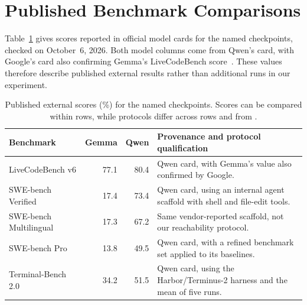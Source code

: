 \section{Published Benchmark Comparisons}
\label{app:external-comparison}

Table~\ref{tab:external-comparison} gives scores reported in official model cards for the named checkpoints, checked on October~6, 2026. Both model columns come from Qwen's card, with Google's card also confirming Gemma's LiveCodeBench score~\cite{qwen2026qwen36,google2026gemma4}. These values therefore describe published external results rather than additional runs in our experiment.

\begin{table}[t]
\centering
\caption{Published external scores (\%) for the named checkpoints. Scores can be compared within rows, while protocols differ across rows and from \benchmark.}
\label{tab:external-comparison}
\scriptsize
\begin{tabularx}{\textwidth}{lrrX}
\toprule
Benchmark & Gemma & Qwen & Provenance and protocol qualification \\
\midrule
LiveCodeBench v6 & 77.1 & 80.4 & Qwen card, with Gemma's value also confirmed by Google. \\
SWE-bench Verified & 17.4 & 73.4 & Qwen card, using an internal agent scaffold with shell and file-edit tools. \\
SWE-bench Multilingual & 17.3 & 67.2 & Same vendor-reported scaffold, not our reachability protocol. \\
SWE-bench Pro & 13.8 & 49.5 & Qwen card, with a refined benchmark set applied to its baselines. \\
Terminal-Bench 2.0 & 34.2 & 51.5 & Qwen card, using the Harbor/Terminus-2 harness and the mean of five runs. \\
\bottomrule
\end{tabularx}
\end{table}

\clearpage
\nolinenumbers
\twocolumn
